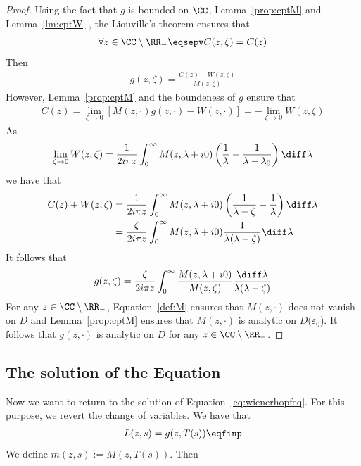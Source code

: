 \begin{proof}
Using the fact that $g$ is bounded on $\CC$, Lemma~\ref{prop:cptM} and Lemma~\ref{lm:cptW}
, the Liouville's theorem ensures that
\begin{align*}
    \forall z \in \CC \setminus \RR_-
    \eqsepv
    C(z,\zeta) = C(z)
\end{align*}
Then 
\begin{align}
    g(z,\zeta) = \frac{C(z)+W(z,\zeta)}{M(z,\zeta)}
\end{align}
However, Lemma~\ref{prop:cptM} and the boundeness of $g$ ensure that
\begin{align}
C(z) 
= \lim_{\zeta \to 0}[M(z,\cdot)g(z,\cdot) - W(z,\cdot)] 
= -\lim_{\zeta \to 0}W(z,\zeta)
\end{align}
As
$$ \lim_{\zeta \to 0}W(z,\zeta) 
= \frac{1}{2i\pi z}\int_0^\infty  {M(z,\lambda+i0)}\left( \frac{1}{\lambda} - \frac{1}{\lambda-\lambda_0}\right) \diff \lambda $$
we have that
\begin{align*}
    C(z) + W(z,\zeta)
    &= 
    \frac{1}{2i \pi z}\int_0^\infty  {M(z,\lambda+i0)}\left( \frac{1}{\lambda-\zeta}-\frac{1}{\lambda}\right) \diff \lambda \\
    &= 
    \frac{\zeta}{2i\pi z}\int_0^\infty  {M(z,\lambda+i0)}\frac{1}{\lambda(\lambda-\zeta)} \diff \lambda \\
\end{align*}
It follows that 
\begin{align*}
    g(z,\zeta) 
    &= 
    \frac{\zeta}{2i \pi z}\int_0^\infty  \frac{M(z,\lambda+i0)}{M(z,\zeta)} \frac{\diff \lambda}{\lambda(\lambda-\zeta)} \\
\end{align*}
For any $z \in \CC \setminus \RR_-$, Equation~\eqref{def:M} ensures that $M(z, \cdot)$ does not vanish on $D$ and Lemma~\ref{prop:cptM} ensures that $M(z, \cdot)$ is analytic on $D(\varepsilon_0$). It follows that $g(z, \cdot)$ is analytic on $D$ for any $z \in \CC \setminus \RR_-$.

\end{proof}

\subsection{The solution of the Equation}
Now we want to return to the solution of Equation~\eqref{eq:wienerhopfeq}. For this purpose, we revert the change of variables. We have that 
\begin{align}
    L(z,s) = g(z, T(s)) 
    \eqfinp
\end{align}
We define $m(z,s) := M(z, T(s))$. Then

